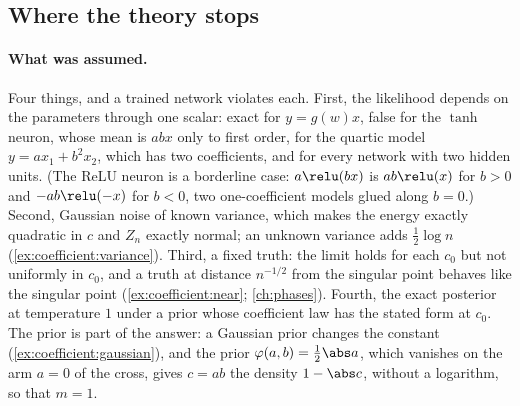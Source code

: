 \begin{refsection}
\section{Where the theory stops}\label{sec:coefficient:stops}

\paragraph{What was assumed.} Four things, and a trained network violates each. First, the likelihood depends on the parameters through one scalar: exact for $y=g(w)x$, false for the $\tanh$ neuron, whose mean is $abx$ only to first order, for the quartic model $y=ax_1+b^2x_2$, which has two coefficients, and for every network with two hidden units. (The ReLU neuron is a borderline case: $a\relu(bx)$ is $ab\relu(x)$ for $b>0$ and $-ab\relu(-x)$ for $b<0$, two one-coefficient models glued along $b=0$.) Second, Gaussian noise of known variance, which makes the energy exactly quadratic in $c$ and $Z_n$ exactly normal; an unknown variance adds $\frac12\log n$ (\cref{ex:coefficient:variance}). Third, a fixed truth: the limit holds for each $c_0$ but not uniformly in $c_0$, and a truth at distance $n^{-1/2}$ from the singular point behaves like the singular point (\cref{ex:coefficient:near}; \cref{ch:phases}). Fourth, the exact posterior at temperature $1$ under a prior whose coefficient law has the stated form at $c_0$. The prior is part of the answer: a Gaussian prior changes the constant (\cref{ex:coefficient:gaussian}), and the prior $\varphi(a,b)=\frac12\abs a$, which vanishes on the arm $a=0$ of the cross, gives $c=ab$ the density $1-\abs c$, without a logarithm, so that $m=1$.


\end{refsection}
